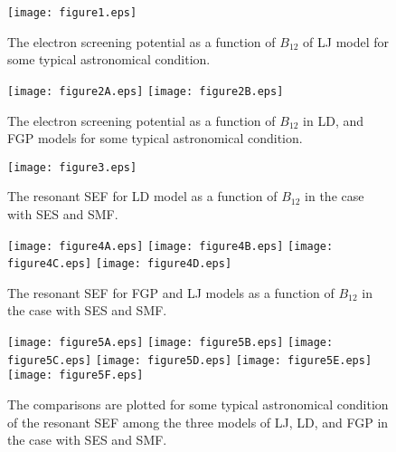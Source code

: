 \documentclass[manuscript]{aastex}
\begin{document}
\clearpage

\begin{figure*}
\centering
\texttt{[image: figure1.eps]}
  \caption{The electron screening potential as a function of $B_{12}$ of LJ model for some typical astronomical condition.\label{fig1}}
\end{figure*}
\begin{figure*}
\centering
    \texttt{[image: figure2A.eps]}%
    \texttt{[image: figure2B.eps]}
\caption{The electron screening potential as a function of $B_{12}$
in LD, and FGP models for some typical astronomical
condition.\label{fig2}}
\end{figure*}
\begin{figure*}
  \centering
\texttt{[image: figure3.eps]}
  \caption{The resonant SEF for LD model as a function of $B_{12}$
in the case with SES and SMF.\label{fig3}}
\end{figure*}

\begin{figure*}
\centering
\texttt{[image: figure4A.eps]}%
    \texttt{[image: figure4B.eps]}
    \texttt{[image: figure4C.eps]}%
    \texttt{[image: figure4D.eps]}

\caption{The resonant SEF for FGP and LJ models as a function of
$B_{12}$ in the case with SES and SMF.\label{fig4}}
\end{figure*}


\begin{figure*}
\centering
     \texttt{[image: figure5A.eps]}%
    \texttt{[image: figure5B.eps]}
    \texttt{[image: figure5C.eps]}%
    \texttt{[image: figure5D.eps]}
    \texttt{[image: figure5E.eps]}%
    \texttt{[image: figure5F.eps]}

\caption{The comparisons are plotted for some typical astronomical
condition of the resonant SEF among the three models of LJ, LD, and
FGP in the case with SES and SMF.\label{fig5}}
\end{figure*}
\end{document}
